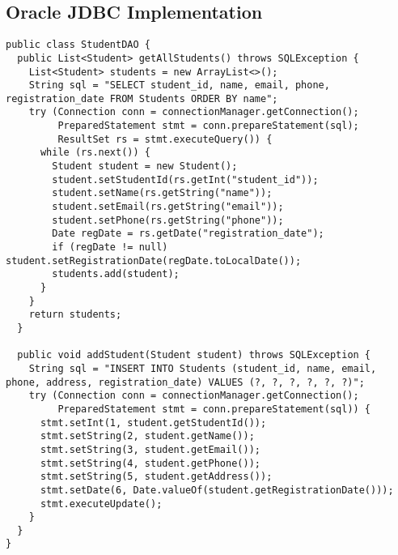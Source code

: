 \documentclass[12pt,a4paper]{article}
\begin{document}
\subsection{Oracle JDBC Implementation}
\begin{lstlisting}[style=java, caption=Oracle JDBC Implementation]
public class StudentDAO {
  public List<Student> getAllStudents() throws SQLException {
    List<Student> students = new ArrayList<>();
    String sql = "SELECT student_id, name, email, phone, registration_date FROM Students ORDER BY name";
    try (Connection conn = connectionManager.getConnection();
         PreparedStatement stmt = conn.prepareStatement(sql);
         ResultSet rs = stmt.executeQuery()) {
      while (rs.next()) {
        Student student = new Student();
        student.setStudentId(rs.getInt("student_id"));
        student.setName(rs.getString("name"));
        student.setEmail(rs.getString("email"));
        student.setPhone(rs.getString("phone"));
        Date regDate = rs.getDate("registration_date");
        if (regDate != null) student.setRegistrationDate(regDate.toLocalDate());
        students.add(student);
      }
    }
    return students;
  }

  public void addStudent(Student student) throws SQLException {
    String sql = "INSERT INTO Students (student_id, name, email, phone, address, registration_date) VALUES (?, ?, ?, ?, ?, ?)";
    try (Connection conn = connectionManager.getConnection();
         PreparedStatement stmt = conn.prepareStatement(sql)) {
      stmt.setInt(1, student.getStudentId());
      stmt.setString(2, student.getName());
      stmt.setString(3, student.getEmail());
      stmt.setString(4, student.getPhone());
      stmt.setString(5, student.getAddress());
      stmt.setDate(6, Date.valueOf(student.getRegistrationDate()));
      stmt.executeUpdate();
    }
  }
}
\end{lstlisting}
\end{document}
